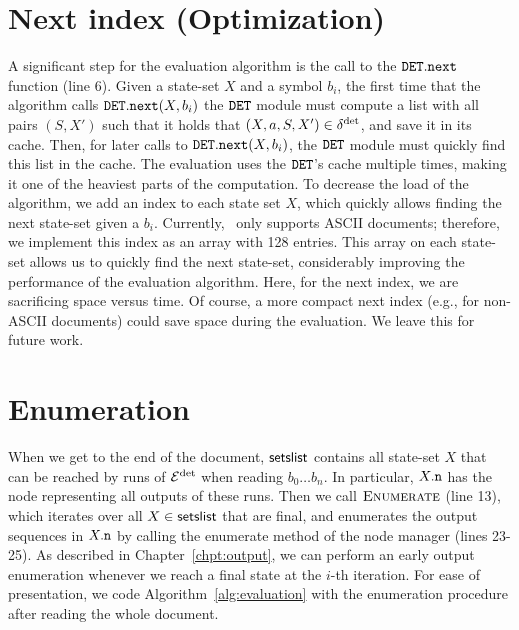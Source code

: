 \section{Next index (Optimization)} 
A significant step for the evaluation algorithm is the call to the $\mathtt{DET}.\texttt{next}$ function (line 6). Given a state-set $X$ and a symbol $b_i$, the first time that the algorithm calls $\mathtt{DET}.\texttt{next}(X, b_i)$ the $\mathtt{DET}$ module must compute a list with all pairs $(S, X')$ such that it holds that $(X,a,S,X') \in \delta^{\operatorname{det}}$, and save it in its cache. Then, for later calls to  $\mathtt{DET}.\texttt{next}(X, b_i)$, the $\mathtt{DET}$ module must quickly find this list in the cache. The evaluation uses the $\mathtt{DET}$'s cache multiple times, making it  one of the heaviest parts of the computation. To decrease the load of the algorithm, we add an index to each state set $X$, which quickly allows finding the next state-set given a $b_i$. Currently, \rematch\ only supports ASCII documents; therefore, we implement this index as an array with 128 entries. This array on each state-set allows us to quickly find the next state-set, considerably improving the performance of the evaluation algorithm. Here, for the next index, we are sacrificing space versus time. Of course, a more compact next index (e.g., for non-ASCII documents) could save space during the evaluation. We leave this for future work. 

\section{Enumeration} 
When we get to the end of the document, $\textsf{setslist}$ contains all state-set $X$ that can be reached by runs of $\mathcal{E}^{\operatorname{det}}$ when reading $b_0 \ldots b_n$. In particular, $X.\mathtt{n}$ has the node representing all outputs of these runs. Then we call $\textproc{Enumerate}$ (line 13), which iterates over all $X \in \textsf{setslist}$ that are final, and enumerates the output sequences in $X.\mathtt{n}$ by calling the enumerate method of the node manager (lines 23-25).
%
As described in Chapter~\ref{chpt:output}, we can perform an early output enumeration whenever we reach a final state at the $i$-th iteration. For ease of presentation, we code Algorithm~\ref{alg:evaluation} with the enumeration procedure after reading the whole document. %


